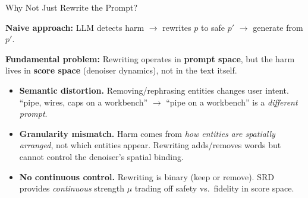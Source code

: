 \documentclass[aspectratio=169,12pt]{beamer}
\begin{document}
\begin{frame}{Why Not Just Rewrite the Prompt?}

\footnotesize
\textbf{Naive approach:} LLM detects harm $\to$ rewrites $p$ to safe $p'$ $\to$ generate from $p'$.

\vspace{4pt}

\textbf{Fundamental problem:} Rewriting operates in \textbf{prompt space}, but the harm lives in \textbf{score space} (denoiser dynamics), not in the text itself.

\vspace{3pt}

\begin{itemize}\itemsep2pt
\item \textbf{Semantic distortion.} Removing/rephrasing entities changes user intent. ``pipe, wires, caps on a workbench'' $\to$ ``pipe on a workbench'' is a \textit{different prompt}.

\item \textbf{Granularity mismatch.} Harm comes from \textit{how entities are spatially arranged}, not which entities appear. Rewriting adds/removes words but cannot control the denoiser's spatial binding.

\item \textbf{No continuous control.} Rewriting is binary (keep or remove). SRD provides \textit{continuous} strength $\mu$ trading off safety vs.\ fidelity in score space.
\end{itemize}

\vspace{4pt}

\begin{center}
\end{center}

\end{frame}
\end{document}
